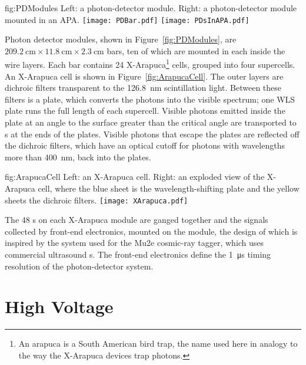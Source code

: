 \begin{dunefigure}{fig:PDModules}
{Left: a photon-detector module. Right: a photon-detector module mounted in an APA.}
\texttt{[image: PDBar.pdf]}
\texttt{[image: PDsInAPA.pdf]}
\end{dunefigure}

Photon detector modules, shown in Figure~\ref{fig:PDModules}, are $\SI{209.2}{\cm}\times\SI{11.8}{\cm}\times\SI{2.3}{\cm}$ bars, ten of which are mounted in each  inside the wire layers. Each bar contains 24 X-Arapuca\footnote{An arapuca is a South American bird trap, the name used here in analogy to the way the X-Arapuca devices trap photons.} cells, grouped into four supercells. An X-Arapuca cell is shown in Figure~\ref{fig:ArapucaCell}. The outer layers are dichroic filters transparent to the \SI{126.8}{\nano\meter} scintillation light. Between these filters is a  plate, which converts the photons into the visible spectrum; one WLS plate runs the full length of each supercell.
Visible photons emitted inside the  plate at an angle to the surface greater than the critical angle are transported to s at the ends of the plates. Visible photons that escape the  plates are reflected off the dichroic filters, which have an optical cutoff for photons with wavelengths more than \SI{400}{\nano\meter}, back into the  plates. 

\begin{dunefigure}{fig:ArapucaCell}
{Left: an X-Arapuca cell. Right: an exploded view of the X-Arapuca cell, where the blue sheet is the wavelength-shifting plate and the yellow sheets the dichroic filters.}
\texttt{[image: XArapuca.pdf]}
\end{dunefigure}

The 48 s on each X-Arapuca module are ganged together and the signals collected by front-end electronics, mounted on the module, the design of which is inspired by the system used for the Mu2e cosmic-ray tagger, which uses commercial ultrasound s. The front-end electronics define the \SI{1}{\micro\second} timing resolution of the photon-detector system.

\section{High Voltage}
\label{sec:fdsp-exec-hv}

